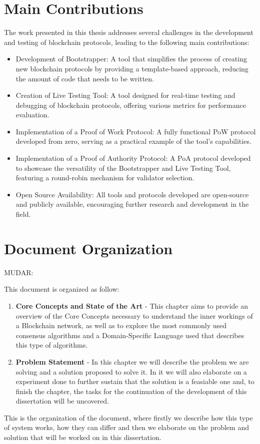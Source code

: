 \section{Main Contributions}


The work presented in this thesis addresses several challenges in the development and testing of blockchain protocols, leading to the following main contributions:

\begin{itemize}
\item Development of Bootstrapper: A tool that simplifies the process of creating new blockchain protocols by providing a template-based approach, reducing the amount of code that needs to be written.

\item Creation of Live Testing Tool: A tool designed for real-time testing and debugging of blockchain protocols, offering various metrics for performance evaluation.

\item Implementation of a Proof of Work Protocol: A fully functional PoW protocol developed from zero, serving as a practical example of the tool's capabilities.

\item Implementation of a Proof of Authority Protocol: A PoA protocol developed to showcase the versatility of the Bootstrapper and Live Testing Tool, featuring a round-robin mechanism for validator selection.

\item Open Source Availability: All tools and protocols developed are open-source and publicly available, encouraging further research and development in the field.

\end{itemize}


\section{Document Organization}
MUDAR:

This document is organized as follow:
\begin{enumerate}
    \item \textbf{Core Concepts and State of the Art} - This chapter aims to provide an overview of the Core Concepts necessary to understand the inner workings of a Blockchain network, as well as to explore the most commonly used consensus algorithms and a Domain-Specific Language used that describes this type of algorithms.
    \item \textbf{Problem Statement} - In this chapter we will describe the problem we are solving and a solution proposed to solve it. In it we will also elaborate on a experiment done to further sustain that the solution is a feasiable one and, to finish the chapter, the tasks for the continuation of the development of this dissertation will be uncovered.
\end{enumerate}

This is the organization of the document, where firstly we describe how this type of system works, how they can differ and then we elaborate on the problem and solution that will be worked on in this dissertation.
